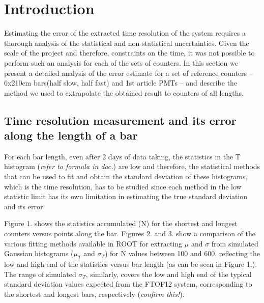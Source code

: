 \documentclass[12pt]{article}
\begin{document}
\maketitle


 
\section{Introduction}

Estimating the error of the extracted time resolution of the system requires a thorough analysis of the statistical and non-statistical uncertainties. Given the scale of the project and therefore, constraints on the time, it was not possible to perform such an analysis for each of the sets of counters. In this section we present a detailed analysis of the error estimate for a set of reference counters -- 6x210cm bars(half slow, half fast) and 1st article PMTs -- and describe the method we used to extrapolate the obtained result to counters of all lengths.

\subsection{Time resolution measurement and its error along the length of a bar}
For each bar length, even after 2 days of data taking, the statistics in the T histogram (\textit{refer to formula in doc.}) are low and therefore, the statistical methods that can be used to fit and obtain the standard deviation of these histograms, which is the time resolution, has to be studied since each method in the low statistic limit has its own limitation in estimating the true standard deviation and its error. 

Figure 1. shows the statistics accumulated (N) for the shortest and longest counters versus points along the bar. Figures 2. and 3. show a comparison of the various fitting methods available in ROOT for extracting $\mu$ and $\sigma$ from simulated Gaussian histograms ($\mu_{T}$ and $\sigma_{T}$) for N values between 100 and 600, reflecting the low and high end of the statistics versus bar length (as can be seen in Figure 1.). The range of simulated $\sigma_{T}$, similarly, covers the low and high end of the typical standard deviation values expected from the FTOF12 system, corresponding to the shortest and longest bars, respectively (\textit{confirm this!}).
\end{document}
